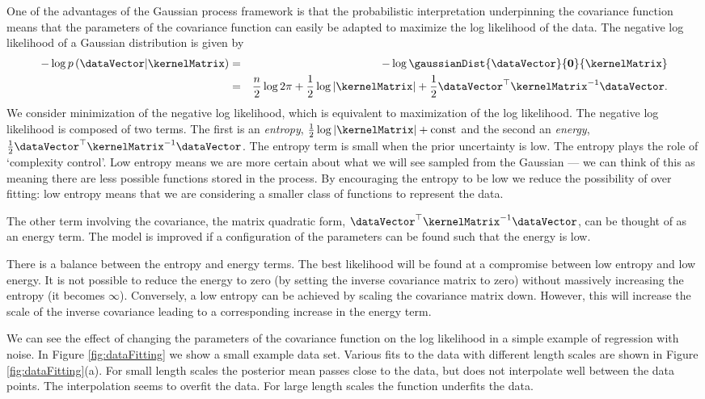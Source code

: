 One of the advantages of the Gaussian process framework is that the
probabilistic interpretation underpinning the covariance function
means that the parameters of the covariance function can easily be
adapted to maximize the log likelihood of the data.  The negative log
likelihood of a Gaussian distribution is given by
\begin{eqnarray}
  -  \log p\left(\dataVector | \kernelMatrix\right) &=& -\log \gaussianDist{\dataVector}{\mathbf{0}}{\kernelMatrix} \nonumber \\
  &=& \frac{n}{2}\log 2\pi + \frac{1}{2}\log \left\vert \kernelMatrix \right\vert + \frac{1}{2}\dataVector^\top\kernelMatrix^{-1}\dataVector.
\end{eqnarray}
We consider minimization of the negative log likelihood, which is
equivalent to maximization of the log likelihood. The negative log
likelihood is composed of two terms. The first is an \emph{entropy},
$\frac{1}{2}\log \left\vert \kernelMatrix \right\vert + \mathrm{const}$
and the second an \emph{energy},
$\frac{1}{2}\dataVector^\top\kernelMatrix^{-1}\dataVector$. The entropy
term is small when the prior uncertainty is low.  The entropy plays
the role of `complexity control'. Low entropy means we are more
certain about what we will see sampled from the Gaussian --- we can
think of this as meaning there are less possible functions stored in
the process. By encouraging the entropy to be low we reduce the
possibility of over fitting: low entropy means that we are considering
a smaller class of functions to represent the data.

The other term involving the covariance, the matrix quadratic form,
$\dataVector^\top\kernelMatrix^{-1}\dataVector$, can be thought of as an
energy term. The model is improved if a configuration of the
parameters can be found such that the energy is low.

There is a balance between the entropy and energy terms. The best
likelihood will be found at a compromise between low entropy and low
energy. It is not possible to reduce the energy to zero (by setting the
inverse covariance matrix to zero) without massively increasing the
entropy (it becomes $\infty$). Conversely, a low entropy can be
achieved by scaling the covariance matrix down. However, this will
increase the scale of the inverse covariance leading to a
corresponding increase in the energy term.

We can see the effect of changing the parameters of the covariance
function on the log likelihood in a simple example of regression with
noise. In Figure \ref{fig:dataFitting} we show a small example data
set. Various fits to the data with different length scales are shown
in Figure \ref{fig:dataFitting}(a). For small length scales the
posterior mean passes close to the data, but does not interpolate well
between the data points. The interpolation seems to overfit the
data. For large length scales the function underfits the data.


